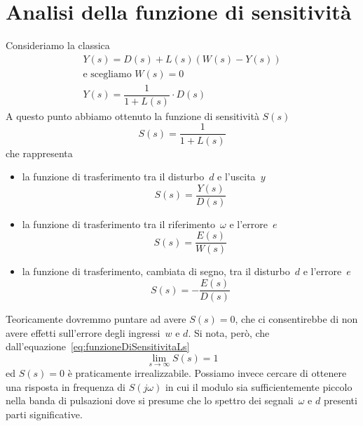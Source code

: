 \documentclass[a4paper]{report}
\begin{document}
\section{Analisi della funzione di sensitivit\`a}
Consideriamo la classica
\[
\begin{array}{l}
  Y(s) = D(s) + L(s)(W(s) - Y(s))\\
  \textrm{e scegliamo } W(s) = 0\\
  Y(s) = \dfrac{1}{1 + L(s)} \cdot D(s)
\end{array}
\]
A questo punto abbiamo ottenuto la funzione di sensitivit\`a $S(s)$
\begin{equation}\label{eq:funzioneDiSensitivitaLs}
S(s) = \dfrac{1}{1 + L(s)}
\end{equation}
che rappresenta
\begin{itemize}
\item la funzione di trasferimento tra il disturbo~$d$ e l'uscita~$y$
  \[
   S(s)  = \dfrac{Y(s)}{D(s)}
  \]
\item la funzione di trasferimento tra il riferimento~$\omega$ e
  l'errore~$e$
  \[
  S(s) = \dfrac{E(s)}{W(s)}
  \]
\item la funzione di trasferimento, cambiata di segno, tra il
  disturbo~$d$ e l'errore~$e$
  \[
  S(s) = - \dfrac{E(s)}{D(s)}
  \]
\end{itemize}
Teoricamente dovremmo puntare ad avere $S(s) = 0$, che ci consentirebbe
di non avere effetti sull'errore degli ingressi~$w$ e $d$. Si
nota, per\`o, che dall'equazione~\ref{eq:funzioneDiSensitivitaLs}
\[
\lim_{s \to \infty} S(s) = 1
\]
ed $S(s) = 0$ \`e praticamente irrealizzabile.
Possiamo invece cercare di ottenere una risposta in frequenza di $S(j
\omega)$ in cui il modulo sia sufficientemente piccolo nella banda di
pulsazioni dove si presume che lo spettro dei segnali~$\omega$ e $d$
presenti parti significative.
\end{document}
